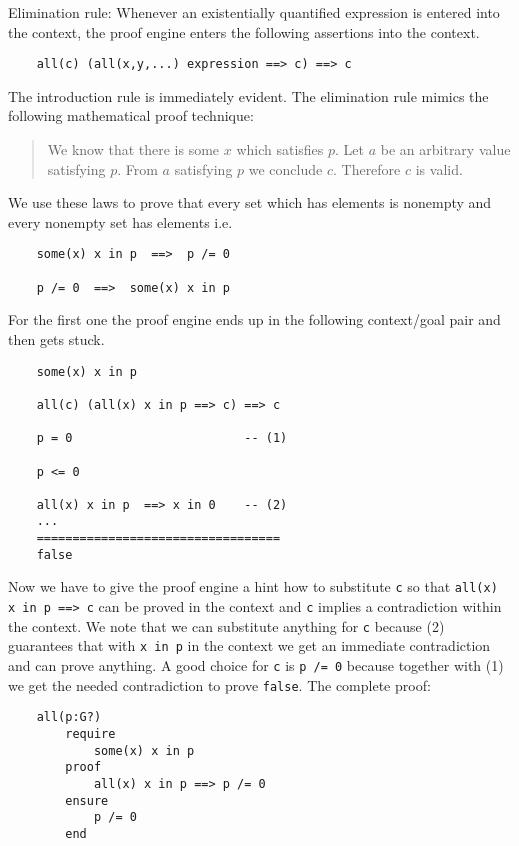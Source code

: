 Elimination rule: Whenever an existentially quantified expression is entered
into the context, the proof engine enters the following assertions into the
context.
\begin{lstlisting}
    all(c) (all(x,y,...) expression ==> c) ==> c
\end{lstlisting}

The introduction rule is immediately evident. The elimination rule mimics the
following mathematical proof technique:
\begin{quote}
  We know that there is some $x$ which satisfies $p$. Let $a$ be an arbitrary value
  satisfying $p$. From $a$ satisfying $p$ we conclude $c$. Therefore $c$ is valid.
\end{quote}

We use these laws to prove that every set which has elements is nonempty and
every nonempty set has elements i.e.
\begin{lstlisting}
    some(x) x in p  ==>  p /= 0

    p /= 0  ==>  some(x) x in p
\end{lstlisting}
For the first one the proof engine ends up in the following context/goal pair
and then gets stuck.
\begin{lstlisting}
    some(x) x in p

    all(c) (all(x) x in p ==> c) ==> c

    p = 0                        -- (1)

    p <= 0

    all(x) x in p  ==> x in 0    -- (2)
    ...
    ==================================
    false
\end{lstlisting}
Now we have to give the proof engine a hint how to substitute \lstinline!c! so
that \lstinline!all(x) x in p ==> c! can be proved in the context and
\lstinline!c! implies a contradiction within the context. We note that we can
substitute anything for \lstinline!c! because (2) guarantees that with
\lstinline!x in p! in the context we get an immediate contradiction and can
prove anything. A good choice for \lstinline!c! is \lstinline!p /= 0! because
together with (1) we get the needed contradiction to prove
\lstinline!false!. The complete proof:

\begin{lstlisting}  
    all(p:G?)
        require
            some(x) x in p
        proof
            all(x) x in p ==> p /= 0
        ensure
            p /= 0
        end
\end{lstlisting}

